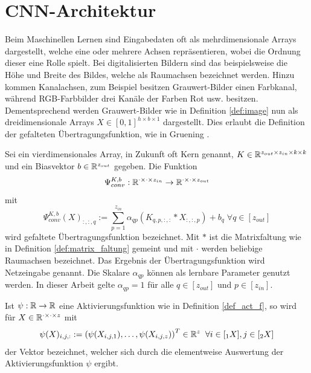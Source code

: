 \section{CNN-Architektur}
\label{abs:CNN_arch}
Beim Maschinellen Lernen sind Eingabedaten oft als mehrdimensionale Arrays dargestellt, welche eine oder mehrere Achsen repräsentieren, wobei die Ordnung dieser eine Rolle spielt. Bei digitalisierten Bildern sind das beispielsweise die Höhe und Breite des Bildes, welche als Raumachsen bezeichnet werden. Hinzu kommen Kanalachsen, zum Beispiel besitzen Grauwert-Bilder einen Farbkanal, während RGB-Farbbilder drei Kanäle der Farben Rot usw. besitzen. Dementsprechend werden Grauwert-Bilder wie in Definition \ref{def:image} nun als dreidimensionale Arrays $X \in [0,1]^{h \times b \times 1}$ dargestellt. Dies erlaubt die Definition der gefalteten Übertragungsfunktion, wie in Gruening \cite{gruening}.

\begin{defi}
    \label{eq:convlogit}
    Sei ein vierdimensionales Array, in Zukunft oft Kern genannt, $K \in \mathbb{R}^{z_{out} \times z_{in} \times k \times k}$ und ein Biasvektor $b \in \mathbb{R}^{z_{out}}$ gegeben. Die Funktion 
    \begin{equation*}
        \Psi_{conv}^{K,b}: \mathbb{R}^{\cdot \times \cdot \times z_{in}} \rightarrow \mathbb{R}^{\cdot \times \cdot\times z_{out}}
    \end{equation*}
    mit
    \begin{equation*}
        \Psi_{conv}^{K,b}(X)_{:,:,q}:= \sum_{p=1}^{z_{in}} \alpha_{qp} \left(K_{q,p,:,:} \ast X_{:,:,p} \right) +b_q \; \forall q \in [z_{out}]
    \end{equation*}
    wird gefaltete Übertragungsfunktion bezeichnet. Mit $\ast$ ist die Matrixfaltung wie in Definition \ref{def:matrix_faltung} gemeint und mit $\cdot$ werden beliebige Raumachsen bezeichnet. Das Ergebnis der Übertragungsfunktion wird Netzeingabe genannt. Die Skalare $\alpha_{qp}$ können als lernbare Parameter genutzt werden. In dieser Arbeit gelte $\alpha_{qp}=1$ für alle $q \in [z_{out}]$ und $p \in [z_{in}]$.
\end{defi}


\begin{bem}
    Ist $\psi: \mathbb{R} \rightarrow \mathbb{R}$ eine Aktivierungsfunktion wie in Definition \ref{def_act_f}, so wird für $X \in \mathbb{R}^{\cdot \times \cdot \times z}$ mit 
    \[\psi(X)_{i,j,:}:=\left(\psi(X_{i,j,1}), \ldots, \psi(X_{i,j,z})\right)^T \in \mathbb{R}^z \; \; \forall i \in [{}_1 X], j \in [{}_2 X] 
    \]
    der Vektor bezeichnet, welcher sich durch die elementweise Auswertung der Aktivierungsfunktion $\psi$ ergibt.
\end{bem}

